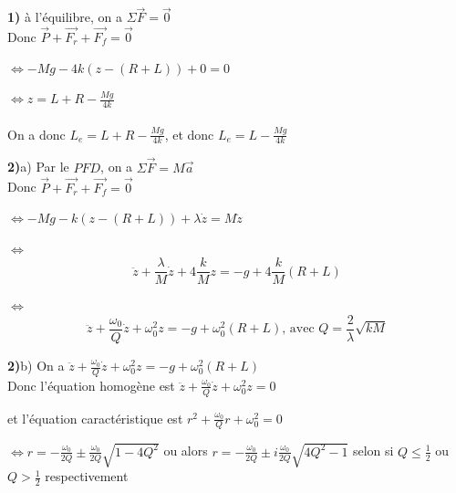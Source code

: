 \documentclass{article}
\begin{document}
\textbf{1)} \hspace{0.2cm} à l'équilibre, on a $\Sigma \overrightarrow{F} = \overrightarrow{0}$ \\

Donc $\overrightarrow{P} + \overrightarrow{F_r} + \overrightarrow{F_f} = \overrightarrow{0}$

\hspace{0.3cm} $\Leftrightarrow -Mg - 4k(z - (R+L)) + 0 = 0$

\hspace{0.3cm} $\Leftrightarrow z = L + R - \frac{Mg}{4k}$ \\ \\
On a donc $L_e = L + R - \frac{Mg}{4k}$, et donc $L_e = L - \frac{Mg}{4k}$


\textbf{2)}a) \hspace{0.2cm} Par le $PFD$, on a $\Sigma \overrightarrow{F} = M\overrightarrow{a}$ \\

Donc $\overrightarrow{P} + \overrightarrow{F_r} + \overrightarrow{F_f} = \overrightarrow{0}$

\hspace{0.3cm} $\Leftrightarrow -Mg - k(z - (R+L)) + \lambda \dot{z} = M \ddot{z}$

\hspace{0.3cm} $\Leftrightarrow$ $$\ddot{z} + \frac{\lambda}{M} \dot{z} + 4 \frac{k}{M} z = -g + 4 \frac{k}{M}(R+L)$$

\hspace{0.3cm} $\Leftrightarrow$ $$\ddot{z} + \frac{\omega_0}{Q} \dot{z} + \omega^2_0 z = -g + \omega^2_0 (R+L) \text{, avec } Q = \frac2\lambda \sqrt{kM}$$

\textbf{2)}b) \hspace{0.2cm} On a $\ddot{z} + \frac{\omega_0}{Q} \dot{z} + \omega^2_0 z = -g + \omega^2_0 (R+L)$ \\

Donc l'équation homogène est $\ddot{z} + \frac{\omega_0}{Q} \dot{z} + \omega^2_0 z = 0$

et l'équation caractéristique est $r^2 + \frac{\omega_0}{Q} r + \omega^2_0 = 0$

\hspace{1cm} $\Leftrightarrow r = - \frac{\omega_0}{2Q} \pm \frac{\omega_0}{2Q} \sqrt{1-4Q^2}$ ou alors $r = - \frac{\omega_0}{2Q} \pm i \frac{\omega_0}{2Q} \sqrt{4Q^2 - 1}$ selon si $Q \leqslant \frac12$ ou $Q > \frac12$ respectivement \\
\end{document}
